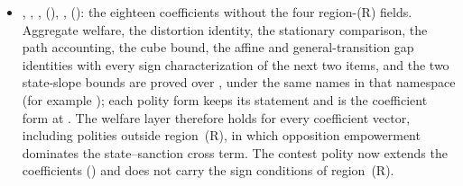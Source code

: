 \begin{itemize}[leftmargin=1.4em,itemsep=1pt]
\item {}, , ,  (), ,  (): the eighteen coefficients without the four region-(R) fields. Aggregate welfare, the distortion identity, the stationary comparison, the path accounting, the cube bound, the affine and general-transition gap identities with every sign characterization of the next two items, and the two state-slope bounds are proved over , under the same names in that namespace (for example ); each polity form keeps its statement and is the coefficient form at . The welfare layer therefore holds for every coefficient vector, including polities outside region~(R), in which opposition empowerment dominates the state--sanction cross term. The contest polity now extends the coefficients () and does not carry the sign conditions of region~(R).

\end{itemize}
